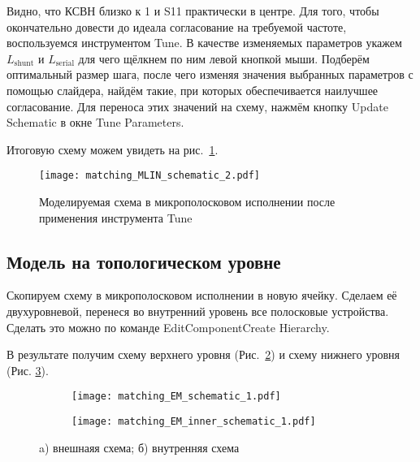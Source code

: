 Видно, что КСВН близко к 1 и S11 практически в центре.
Для того, чтобы окончательно довести до идеала согласование на требуемой частоте, воспользуемся инструментом Tune.
В качестве изменяемых параметров укажем $L_\text{shunt}$ и $L_\text{serial}$ для чего щёлкнем по ним левой кнопкой мыши.
Подберём оптимальный размер шага, после чего изменяя значения выбранных параметров с помощью слайдера, найдём такие, при которых обеспечивается наилучшее согласование.
Для переноса этих значений на схему, нажмём кнопку Update Schematic в окне Tune Parameters.

Итоговую схему можем увидеть на рис.~\ref{fig:matching_MLIN_schematic_2}.

\begin{figure}
    \centering
    \texttt{[image: matching\_MLIN\_schematic\_2.pdf]}
    \caption{Моделируемая схема в микрополосковом исполнении после применения инструмента Tune}%
    \label{fig:matching_MLIN_schematic_2}
\end{figure}

\subsection{Модель на топологическом уровне}

Скопируем схему в микрополосковом исполнении в новую ячейку. Сделаем её двухуровневой, перенеся во внутренний уровень все полосковые устройства. Сделать это можно по команде Edit\textrightarrow Component\textrightarrow Create Hierarchy.

В результате получим схему верхнего уровня (Рис.~\ref{fig:matching_EM_schematic}) и схему нижнего уровня (Рис. \ref{fig:matching_EM_inner_schematic}).

\begin{figure}[!ht]
    \begin{subfigure}[b]{0.6\textwidth}
        \centering
        \texttt{[image: matching\_EM\_schematic\_1.pdf]}
        \caption{}%
    \label{fig:matching_EM_schematic}
    \end{subfigure}
    \hfill
    \begin{subfigure}[b]{0.3\textwidth}
        \centering
        \texttt{[image: matching\_EM\_inner\_schematic\_1.pdf]}
        \caption{}%
    \label{fig:matching_EM_inner_schematic}
    \end{subfigure}
    \caption{
        a) внешнаяя схема;
        б) внутренняя схема
    }%
    \label{fig:matching_EM_schematics}
\end{figure}

